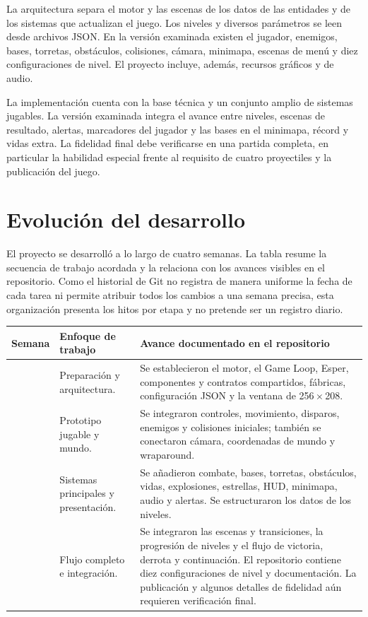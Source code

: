 \documentclass[12pt,letterpaper]{report}
\begin{document}
La arquitectura separa el motor y las escenas de los datos de las entidades y de los sistemas que actualizan el juego. Los niveles y diversos parámetros se leen desde archivos JSON. En la versión examinada existen el jugador, enemigos, bases, torretas, obstáculos, colisiones, cámara, minimapa, escenas de menú y diez configuraciones de nivel. El proyecto incluye, además, recursos gráficos y de audio.

La implementación cuenta con la base técnica y un conjunto amplio de sistemas jugables. La versión examinada integra el avance entre niveles, escenas de resultado, alertas, marcadores del jugador y las bases en el minimapa, récord y vidas extra. La fidelidad final debe verificarse en una partida completa, en particular la habilidad especial frente al requisito de cuatro proyectiles y la publicación del juego.

\chapter{Evolución del desarrollo}

El proyecto se desarrolló a lo largo de cuatro semanas. La tabla resume la secuencia de trabajo acordada y la relaciona con los avances visibles en el repositorio. Como el historial de Git no registra de manera uniforme la fecha de cada tarea ni permite atribuir todos los cambios a una semana precisa, esta organización presenta los hitos por etapa y no pretende ser un registro diario.

\begin{center}\small
\begin{tabularx}{\textwidth}{@{}>{\raggedright\arraybackslash}p{} >{\raggedright\arraybackslash}p{} >{\raggedright\arraybackslash}X@{}}
\toprule
\textbf{Semana} & \textbf{Enfoque de trabajo} & \textbf{Avance documentado en el repositorio} \\
\midrule
1 & Preparación y arquitectura. & Se establecieron el motor, el Game Loop, Esper, componentes y contratos compartidos, fábricas, configuración JSON y la ventana de 256\,$\times$\,208. \\
2 & Prototipo jugable y mundo. & Se integraron controles, movimiento, disparos, enemigos y colisiones iniciales; también se conectaron cámara, coordenadas de mundo y wraparound. \\
3 & Sistemas principales y presentación. & Se añadieron combate, bases, torretas, obstáculos, vidas, explosiones, estrellas, HUD, minimapa, audio y alertas. Se estructuraron los datos de los niveles. \\
4 & Flujo completo e integración. & Se integraron las escenas y transiciones, la progresión de niveles y el flujo de victoria, derrota y continuación. El repositorio contiene diez configuraciones de nivel y documentación. La publicación y algunos detalles de fidelidad aún requieren verificación final. \\
\bottomrule
\end{tabularx}
\end{center}
\end{document}
